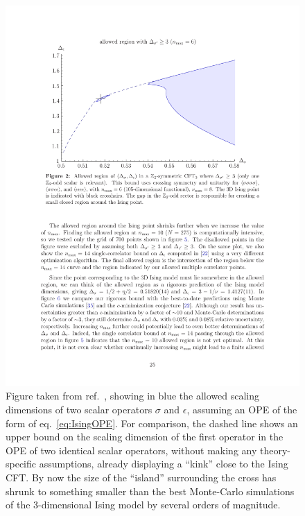 \documentclass[a4paper,12pt]{article}
\numberwithin{equation}{section}
\begin{document}
\begin{figure}
	\centering
	\includegraphics[width=0.8\linewidth]{figures/IsingIsland.pdf}
	\caption{Figure taken from ref.~\cite{Kos:2014bka}, showing
	in blue the allowed scaling dimensions of two scalar operators
	$\sigma$ and $\epsilon$,
	assuming an OPE of the form of eq.~\eqref{eq:IsingOPE}.
	For comparison, the dashed line shows an upper bound on the
	scaling dimension of the first operator in the OPE of
	two identical scalar operators, without making any 
	theory-specific assumptions, already displaying a ``kink''
	close to the Ising CFT.
	By now the size of the ``island'' surrounding the cross
	has shrunk to something smaller than the best Monte-Carlo
	simulations of the 3-dimensional Ising model by several
	orders of magnitude.}
	\label{fig:Ising:island}
\end{figure}
\end{document}
